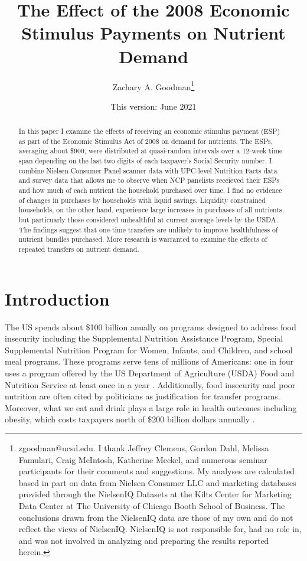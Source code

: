 \documentclass[12pt]{article}
\title{The Effect of the 2008 Economic Stimulus Payments on Nutrient Demand}
\author{Zachary A. Goodman\thanks{zgoodman@ucsd.edu.
I thank Jeffrey Clemens, Gordon Dahl, Melissa Famulari, Craig McIntosh, Katherine Meckel, and numerous seminar participants for their comments and suggestions.
My analyses are calculated based in part on data from Nielsen Consumer LLC and marketing databases provided through the NielsenIQ Datasets at the Kilts Center for Marketing Data Center at The University of Chicago Booth School of Business.
The conclusions drawn from the NielsenIQ data are those of my own and do not reflect the views of NielsenIQ.
NielsenIQ is not responsible for, had no role in, and was not involved in analyzing and preparing the results reported herein.}}
\affil{University of California, San Diego}
\date{This version: June 2021}
\begin{document}
\maketitle

\begin{abstract}
In this paper I examine the effects of receiving an economic stimulus payment (ESP) as part of the Economic Stimulus Act of 2008 on demand for nutrients. The ESPs, averaging about \$900, were distributed at quasi-random intervals over a 12-week time span depending on the last two digits of each taxpayer's Social Security number. I combine Nielsen Consumer Panel scanner data with UPC-level Nutrition Facts data and survey data that allows me to observe when NCP panelists receieved their ESPs and how much of each nutrient the household purchased over time. I find no evidence of changes in purchases by households with liquid savings. Liquidity constrained households, on the other hand, experience large increases in purchases of all nutrients, but particuarly those considered unhealthful at current average levels by the USDA. The findings suggest that one-time transfers are unlikely to improve healthfulness of nutrient bundles purchased. More research is warranted to examine the effects of repeated transfers on nutrient demand.
\end{abstract}

\pagebreak

\doublespacing

\section{Introduction} \label{introduction}

The US spends about \$100 billion anually on programs designed to address food insecurity including the Supplemental Nutrition Assistance Program, Special Supplemental Nutrition Program for Women, Infants, and Children, and school meal programs.
These programs serve tens of millions of Americans: one in four uses a program offered by the US Department of Agriculture (USDA) Food and Nutrition Service at least once in a year \parencite{usdafns}.
Additionally, food insecurity and poor nutrition are often cited by politicians as justification for transfer programs.
Moreover, what we eat and drink plays a large role in health outcomes including obesity, which costs taxpayers north of \$200 billion dollars annually \parencite{cawley2012medical}.
\end{document}
